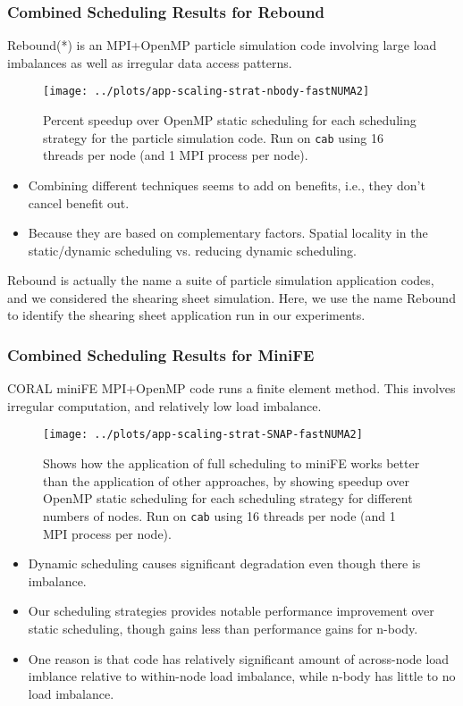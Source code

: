 \begin{frame}[label=combinednbody]
\frametitle{Combined Scheduling Results for Rebound}
{\tiny Rebound(*) is an MPI+OpenMP particle simulation code involving large load
imbalances as well as irregular data access patterns.}
\begin{figure}
\texttt{[image: ../plots/app-scaling-strat-nbody-fastNUMA2]}
\caption{\tiny Percent speedup over OpenMP static scheduling for each
  scheduling strategy for the particle simulation code. Run on
  \texttt{cab} using 16 threads per node (and 1 MPI process per
  node).}

\end{figure}
\begin{itemize}
\tiny \item \tiny Combining different techniques seems to add on
benefits, i.e., they don't cancel benefit out. 
\item \tiny Because they are based on complementary factors. Spatial
  locality in the static/dynamic scheduling vs. reducing dynamic
  scheduling. 
\end{itemize}

{ \tiny *Rebound is actually the name a suite of particle simulation application
  codes, and we considered the shearing sheet simulation. Here, we use the  
  name Rebound to identify the shearing sheet application run in our experiments.  }
\end{frame}

\begin{frame}[label=combinedfe]
\frametitle{Combined Scheduling Results for MiniFE}
{\tiny  CORAL miniFE MPI+OpenMP code runs a finite element method. 
  This involves irregular computation, and relatively low load imbalance.} 
\begin{figure}
\texttt{[image: ../plots/app-scaling-strat-SNAP-fastNUMA2]}
\caption{\tiny Shows how the application of full scheduling to miniFE 
works better than the application of other approaches, by showing speedup over OpenMP
static scheduling for each scheduling strategy for different numbers
of nodes. Run on \texttt{cab} using 16 threads per node
(and 1 MPI process per node).}
\end{figure}

\begin{itemize}
\tiny \item \tiny Dynamic scheduling causes significant degradation 
even though there is imbalance. 
\item \tiny Our scheduling strategies provides notable performance 
improvement over static scheduling, though gains less than performance gains for n-body.
\item \tiny One reason is that code has 
relatively significant amount of across-node load imblance relative
to within-node load imbalance, while n-body has little to no load
imbalance. 
\end{itemize}

\end{frame}

